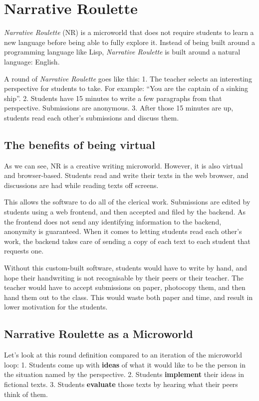 \section{Narrative Roulette}

\emph{Narrative Roulette} (NR) is a microworld that does not require
students to learn a new language before being able to fully explore it.
Instead of being built around a programming language like Lisp,
\emph{Narrative Roulette} is built around a natural language: English.

A round of \emph{Narrative Roulette} goes like this: 1. The teacher
selects an interesting perspective for students to take. For example:
``You are the captain of a sinking ship''. 2. Students have 15 minutes
to write a few paragraphs from that perspective. Submissions are
anonymous. 3. After those 15 minutes are up, students read each other's
submissions and discuss them.

\subsection{The benefits of being virtual}

As we can see, NR is a creative writing microworld. However, it is also
virtual and browser-based. Students read and write their texts in the
web browser, and discussions are had while reading texts off screens.

This allows the software to do all of the clerical work. Submissions are
edited by students using a web frontend, and then accepted and filed by
the backend. As the frontend does not send any identifying information
to the backend, anonymity is guaranteed. When it comes to letting
students read each other's work, the backend takes care of sending a
copy of each text to each student that requests one.

Without this custom-built software, students would have to write by
hand, and hope their handwriting is not recognisable by their peers or
their teacher. The teacher would have to accept submissions on paper,
photocopy them, and then hand them out to the class. This would waste
both paper and time, and result in lower motivation for the students.

\subsection{Narrative Roulette as a Microworld}

Let's look at this round definition compared to an iteration of the
microworld loop: 1. Students come up with \textbf{ideas} of what it
would like to be the person in the situation named by the perspective.
2. Students \textbf{implement} their ideas in fictional texts. 3.
Students \textbf{evaluate} those texts by hearing what their peers think
of them.

